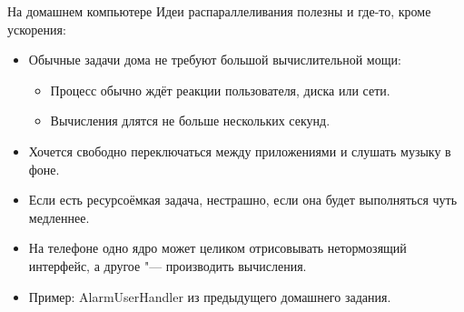 \begin{frame}{На домашнем компьютере}
	Идеи распараллеливания полезны и где-то, кроме ускорения:
	\begin{itemize}
		\item
			Обычные задачи дома не требуют большой вычислительной мощи:
			\begin{itemize}
				\item Процесс обычно ждёт реакции пользователя, диска или сети.
				\item Вычисления длятся не больше нескольких секунд.
			\end{itemize}
		\item Хочется свободно переключаться между приложениями и слушать музыку в фоне.
		\item Если есть ресурсоёмкая задача, нестрашно, если она будет выполняться чуть медленнее.
		\item На телефоне одно ядро может целиком отрисовывать нетормозящий интерфейс, а другое "--- производить вычисления.
		\item Пример: AlarmUserHandler из предыдущего домашнего задания.
	\end{itemize}
\end{frame}
